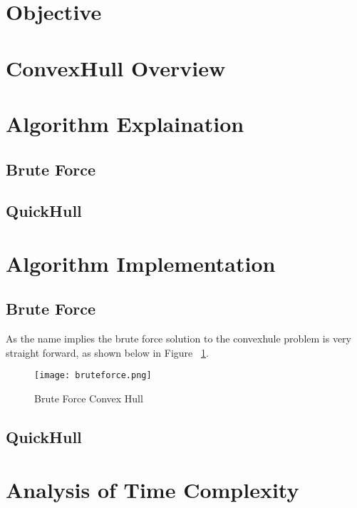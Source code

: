 \documentclass{article}
\begin{document}

\tableofcontents{}
\vspace{10cm}
{
  \section{Objective}
  \section{ConvexHull Overview}
  \section{Algorithm Explaination}
  \subsection{Brute Force}
  \subsection{QuickHull}
  \section{Algorithm Implementation}
  \subsection{Brute Force}
  As the name implies the brute force solution to the convexhule problem is very straight forward, as shown below in Figure ~\ref{fig:bruteforce}.
  \begin{figure}[H]
    \texttt{[image: bruteforce.png]}
    \caption{Brute Force Convex Hull}
    \label{fig:bruteforce}
  \end{figure} 
  \subsection{QuickHull}
  \section{Analysis of Time Complexity}
}
\end{document}
